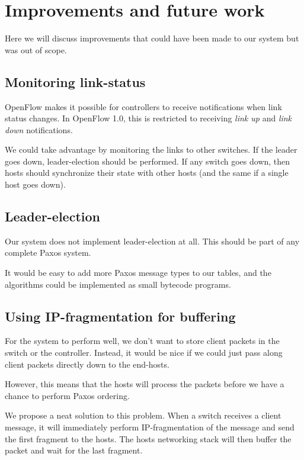 \chapter{Improvements and future work}

Here we will discuss improvements that could have been made to our system
but was out of scope.

\section{Monitoring link-status}

OpenFlow makes it possible for controllers to receive notifications when
link status changes.  In OpenFlow 1.0, this is restricted to receiving
\textit{link up} and \textit{link down} notifications.

We could take advantage by monitoring the links to other switches.
If the leader goes down, leader-election should be performed.
If any switch goes down, then hosts should synchronize their state with
other hosts (and the same if a single host goes down).

\section{Leader-election}

Our system does not implement leader-election at all.  This should be part
of any complete Paxos system.

It would be easy to add more Paxos message types to our tables, and the
algorithms could be implemented as small bytecode programs.

\section{Using IP-fragmentation for buffering}

For the system to perform well, we don't want to store client packets in the
switch or the controller.  Instead, it would be nice if we could just pass
along client packets directly down to the end-hosts.

However, this means that the hosts will process the packets before we have a
chance to perform Paxos ordering.

We propose a neat solution to this problem.  When a switch receives a client
message, it will immediately perform IP-fragmentation of the message and
send the first fragment to the hosts.  The hosts networking stack will then
buffer the packet and wait for the last fragment.

